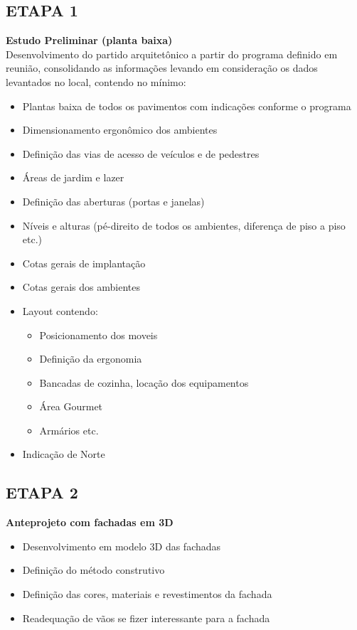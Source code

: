 \documentclass[11pt,a4paper]{article}
\begin{document}
\vspace{0.4cm}
\begin{minipage}{\textwidth}
\subsection*{ETAPA 1}
\textbf{Estudo Preliminar (planta baixa)} \\
Desenvolvimento do partido arquitetônico a partir do programa definido em reunião, consolidando as informações levando em consideração os dados levantados no local, contendo no mínimo:
\begin{itemize}
    \item Plantas baixa de todos os pavimentos com indicações conforme o programa
    \item Dimensionamento ergonômico dos ambientes
    \item Definição das vias de acesso de veículos e de pedestres
    \item Áreas de jardim e lazer
    \item Definição das aberturas (portas e janelas)
    \item Níveis e alturas (pé-direito de todos os ambientes, diferença de piso a piso etc.)
    \item Cotas gerais de implantação
    \item Cotas gerais dos ambientes
    \item Layout contendo:
    \begin{itemize}
        \item Posicionamento dos moveis
        \item Definição da ergonomia
        \item Bancadas de cozinha, locação dos equipamentos
        \item Área Gourmet
        \item Armários etc.
    \end{itemize}
    \item Indicação de Norte
\end{itemize}
\end{minipage}

\vspace{0.5cm}
\begin{minipage}{\textwidth}
\subsection*{ETAPA 2}
\textbf{Anteprojeto com fachadas em 3D}
\begin{itemize}
    \item Desenvolvimento em modelo 3D das fachadas
    \item Definição do método construtivo
    \item Definição das cores, materiais e revestimentos da fachada
    \item Readequação de vãos se fizer interessante para a fachada
\end{itemize}
\end{minipage}
\end{document}
